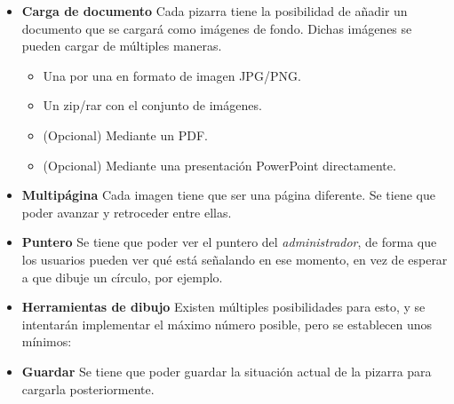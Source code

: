 \begin{itemize}
	\item \textbf{Carga de documento}  Cada pizarra tiene la posibilidad de añadir un documento que se cargará como imágenes de fondo. Dichas imágenes se pueden cargar de múltiples maneras.
	\begin{itemize}
		\item Una por una en formato de imagen JPG/PNG.
		\item Un zip/rar con el conjunto de imágenes.
		\item (Opcional) Mediante un PDF.
		\item (Opcional) Mediante una presentación PowerPoint directamente.
	\end{itemize}
	\item \textbf{Multipágina}  Cada imagen tiene que ser una página diferente. Se tiene que poder avanzar y retroceder entre ellas.
	\item \textbf{Puntero}  Se tiene que poder ver el puntero del \emph{administrador}, de forma que los usuarios pueden ver qué está señalando en ese momento, en vez de esperar a que dibuje un círculo, por ejemplo.
	\item \textbf{Herramientas de dibujo}  Existen múltiples posibilidades para esto, y se intentarán implementar el máximo número posible, pero se establecen unos mínimos:
	\item \textbf{Guardar}  Se tiene que poder guardar la situación actual de la pizarra para cargarla posteriormente.

\end{itemize}
